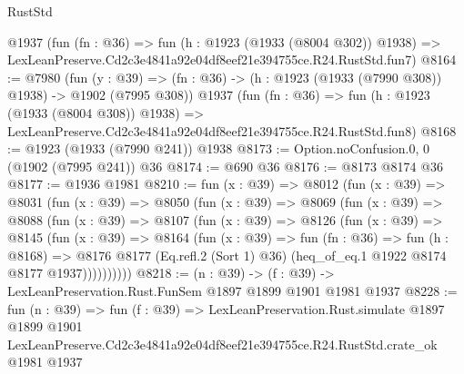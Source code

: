 \begin{lexlean}{RustStd}
\begin{coremodule}
    @1937
    (fun (fn : @36) =>
    fun (h : @1923 (@1933 (@8004 @302)) @1938) =>
    LexLeanPreserve.Cd2c3e4841a92e04df8eef21e394755ce.R24.RustStd.fun7)
@8164 := @7980
    (fun (y : @39) => (fn : @36) -> (h : @1923 (@1933 (@7990 @308)) @1938) -> @1902 (@7995 @308))
    @1937
    (fun (fn : @36) =>
    fun (h : @1923 (@1933 (@8004 @308)) @1938) =>
    LexLeanPreserve.Cd2c3e4841a92e04df8eef21e394755ce.R24.RustStd.fun8)
@8168 := @1923 (@1933 (@7990 @241)) @1938
@8173 := Option.noConfusion.{0, 0} (@1902 (@7995 @241)) @36
@8174 := @690 @36
@8176 := @8173 @8174 @36
@8177 := @1936 @1981
@8210 := fun (x : @39) =>
  @8012
    (fun (x : @39) =>
    @8031
      (fun (x : @39) =>
      @8050
        (fun (x : @39) =>
        @8069
          (fun (x : @39) =>
          @8088
            (fun (x : @39) =>
            @8107
              (fun (x : @39) =>
              @8126
                (fun (x : @39) =>
                @8145
                  (fun (x : @39) =>
                  @8164
                    (fun (x : @39) =>
                    fun (fn : @36) =>
                    fun (h : @8168) =>
                    @8176
                      @8177
                      (Eq.refl.{2} (Sort 1) @36)
                      (heq_of_eq.{1} @1922 @8174 @8177 @1937))))))))))
@8218 := (n : @39) -> (f : @39) -> LexLeanPreservation.Rust.FunSem @1897 @1899 @1901 @1981 @1937
@8228 := fun (n : @39) =>
  fun (f : @39) =>
  LexLeanPreservation.Rust.simulate
    @1897
    @1899
    @1901
    LexLeanPreserve.Cd2c3e4841a92e04df8eef21e394755ce.R24.RustStd.crate_ok
    @1981
    @1937
\end{coremodule}
\end{lexlean}
